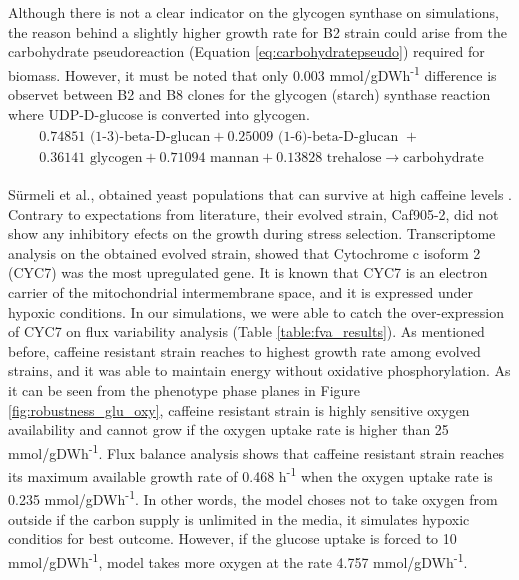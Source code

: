 Although there is not a clear indicator on the glycogen synthase on simulations, the reason behind a slightly higher growth rate for B2 strain could arise from the carbohydrate pseudoreaction (Equation \ref{eq:carbohydratepseudo}) required for biomass. However, it must be noted that only 0.003 mmol/gDWh\textsuperscript{-1} difference is observet between B2 and B8 clones for the glycogen (starch) synthase reaction where UDP-D-glucose is converted into glycogen.
\begin{align}
\begin{split}
\label{eq:carbohydratepseudo}
\  0.74851 \text{ (1-3)-beta-D-glucan} + 0.25009 \text{ (1-6)-beta-D-glucan } + \\
\ 0.36141 \text{ glycogen} + 0.71094 \text{ mannan} + 0.13828 \text{ trehalose} \xrightarrow{}  \text{carbohydrate}
\end{split}
\end{align}

Sürmeli et al., obtained yeast populations that can survive at high caffeine levels \cite{Srmeli2019}. Contrary to expectations from literature, their evolved strain, Caf905-2, did not show any inhibitory efects on the growth during stress selection. Transcriptome analysis on the obtained evolved strain, showed that Cytochrome c isoform 2 (CYC7) was the most upregulated gene. It is known that CYC7 is an electron carrier of the mitochondrial intermembrane space, and it is expressed under hypoxic conditions. In our simulations, we were able to catch the over-expression of CYC7 on flux variability analysis (Table \ref{table:fva_results}). As mentioned before, caffeine resistant strain reaches to highest growth rate among evolved strains, and it was able to maintain energy without oxidative phosphorylation. As it can be seen from the phenotype phase planes in Figure \ref{fig:robustness_glu_oxy}, caffeine resistant strain is highly sensitive oxygen availability and cannot grow if the oxygen uptake rate is higher than 25 mmol/gDWh\textsuperscript{-1}. Flux balance analysis shows that caffeine resistant strain reaches its maximum available growth rate of 0.468 h\textsuperscript{-1} when the oxygen uptake rate is 0.235 mmol/gDWh\textsuperscript{-1}. In other words, the model choses not to take oxygen from outside if the carbon supply is unlimited in the media, it simulates hypoxic conditios for best outcome. However, if the glucose uptake is forced to 10 mmol/gDWh\textsuperscript{-1}, model takes more oxygen at the rate 4.757 mmol/gDWh\textsuperscript{-1}.

